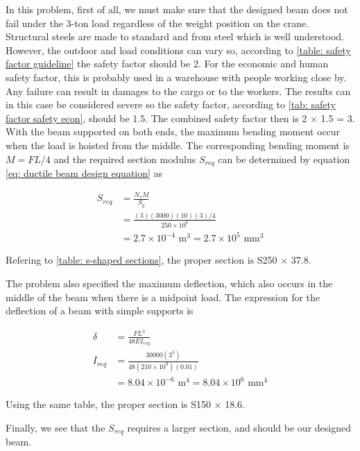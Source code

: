 \documentclass[
10pt,
a4paper,
openany,
svgnames,
]{book}
\begin{document}
\begin{solution}
  In this problem, first of all, we must make sure that the designed beam does not fail under the 3-ton load regardless of the weight position on the crane. Structural steels are made to standard and from steel which is well understood. However, the outdoor and load conditions can vary so, according to \cref{table: safety factor guideline} the safety factor should be 2. For the economic and human safety factor, this is probably used in a warehouse with people working close by. Any failure can result in damages to the cargo or to the workers. The results can in this case be considered severe so the safety factor, according to \cref{tab: safety factor safety econ}, should be 1.5. The combined safety factor then is 2 $\times$ 1.5 = 3. With the beam supported on both ends, the maximum bending moment occur when the load is hoisted from the middle. The corresponding bending moment is $M = FL / 4$ and the required section modulus $S_{req}$ can be determined by equation \eqref{eq: ductile beam design equation} as

  \begin{align*}
    S_{req} &= \frac{N_s M}{S_y} \\
            &= \frac{(3)(3000)(10)(3)/4}{250 \times 10^6} \\
            &= 2.7 \times 10^{-4} \text{ m}^3 = 2.7 \times 10^5 \text{ mm}^3
  \end{align*}

  Refering to \cref{table: s-shaped sections}, the proper section is S250 $\times$ 37.8.

  The problem also specified the maximum deflection, which also occurs in the middle of the beam when there is a midpoint load. The expression for the deflection of a beam with simple supports is

  \begin{align*}
    \delta &= \frac{FL^3}{48EI_{req}} \\
    I_{req} &= \frac{30000(3^3)}{48(210 \times 10^9)(0.01)} \\
           &= 8.04 \times 10^{-6} \text{ m}^4 = 8.04 \times 10^6 \text{ mm}^4
  \end{align*}

  Using the same table, the proper section is S150 $\times$ 18.6.

  Finally, we see that the $S_{req}$ requires a larger section, and should be our designed beam.
\end{solution}
\end{document}
